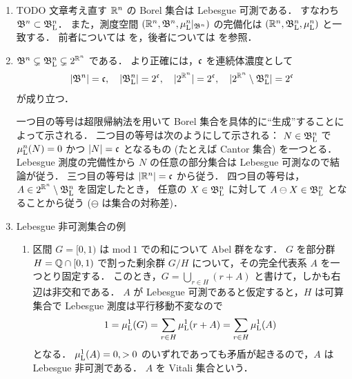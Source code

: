 \begin{remark}\label{rem:Borel_Lebesgue}
    \leavevmode
    \begin{enumerate}
        \item
            {\color{red} TODO 文章考え直す}
            $\mathbb{R}^n$ の Borel 集合は Lebesgue 可測である．
            すなわち $\mathfrak{B}^n\subset\mathfrak{B}_{\mathrm{L}}^n$．
            また，測度空間 $(\mathbb{R}^n,\mathfrak{B}^n,\mu_{\mathrm{L}}^n\vert_{\mathfrak{B}^n})$ の完備化は
            $(\mathbb{R}^n,\mathfrak{B}_{\mathrm{L}}^n,\mu_{\mathrm{L}}^n)$ と一致する．
            前者については \cite[定理 7.2]{It63} を，後者については \cite[p.49]{It63} を参照．

        \item
            $\mathfrak{B}^n\subsetneq\mathfrak{B}_{\mathrm{L}}^n\subsetneq2^{\mathbb{R}^n}$ である．
            より正確には，$\mathfrak{c}$ を連続体濃度として
            \begin{align}
                |\mathfrak{B}^n|=\mathfrak{c},\quad
                |\mathfrak{B}_{\mathrm{L}}^n|=2^{\mathfrak{c}},\quad
                |2^{\mathbb{R}^n}|=2^{\mathfrak{c}},\quad
                |2^{\mathbb{R}^n}\setminus\mathfrak{B}_{\mathrm{L}}^n|=2^{\mathfrak{c}}
            \end{align}
            が成り立つ．

            一つ目の等号は超限帰納法を用いて Borel 集合を具体的に``生成''することによって示される\cite{ms70880}．
            二つ目の等号は次のようにして示される：
            $N\in\mathfrak{B}_{\mathrm{L}}^n$ で $\mu_{\mathrm{L}}^n(N)=0$ かつ $|N|=\mathfrak{c}$ となるもの (たとえば Cantor 集合) を一つとる．
            Lebesgue 測度の完備性から $N$ の任意の部分集合は Lebesgue 可測なので結論が従う．
            三つ目の等号は $|\mathbb{R}^n|=\mathfrak{c}$ から従う．
            四つ目の等号は，$A\in2^{\mathbb{R}^n}\setminus\mathfrak{B}_{\mathrm{L}}^n$ を固定したとき，
            任意の $X\in\mathfrak{B}_{\mathrm{L}}^n$ に対して $A\ominus X\in\mathfrak{B}_{\mathrm{L}}^n$ となることから従う ($\ominus$ は集合の対称差)．

        \item Lebesgue 非可測集合の例
            \begin{enumerate}
                \item
                    区間 $G=[0,1)$ は $\mathrm{mod}\ 1$ での和について Abel 群をなす．
                    $G$ を部分群 $H=\mathbb{Q}\cap[0,1)$ で割った剰余群 $G/H$ について，その完全代表系 $A$ を一つとり固定する．
                    このとき，$G=\bigcup_{r\in H}(r+A)$ と書けて，しかも右辺は非交和である．
                    $A$ が Lebesgue 可測であると仮定すると，$H$ は可算集合で Lebesgue 測度は平行移動不変なので
                    \begin{align*}
                        1
                        =\mu_{\mathrm{L}}^1(G)
                        =\sum_{r\in H}\mu_{\mathrm{L}}^1(r+A)
                        =\sum_{r\in H}\mu_{\mathrm{L}}^1(A)
                    \end{align*}
                    となる．
                    $\mu_{\mathrm{L}}^1(A)=0,>0$ のいずれであっても矛盾が起きるので，$A$ は Lebesgue 非可測である．
                    $A$ を Vitali 集合という．


\end{enumerate}
\end{enumerate}
\end{remark}
